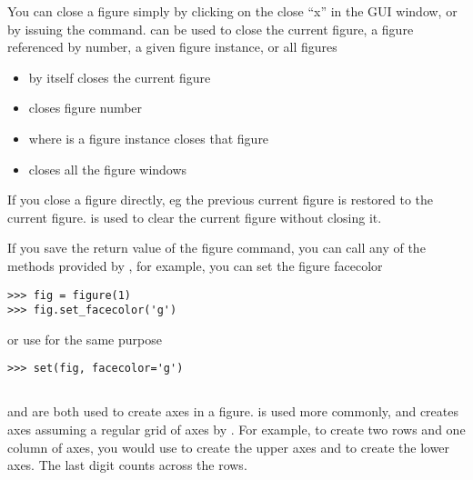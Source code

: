 \documentclass[twoside]{book}
\begin{document}
You can close a figure simply by clicking on the close ``x'' in the
GUI window, or by issuing the  command.   can
be used to close the current figure, a figure referenced by number, a
given figure instance, or all figures

\begin{itemize}

  \item {} by itself closes the current figure

  \item {} closes figure number 
    
  \item {} where  is a figure instance closes
    that figure

  \item {} closes all the figure windows

\end{itemize}
    
\noindent If you close a figure directly, eg  the
previous current figure is restored to the current figure. 
is used to clear the current figure without closing it.

If you save the return value of the figure command, you can call any
of the methods provided by , for
example, you can set the figure facecolor

\begin{lstlisting}
>>> fig = figure(1)
>>> fig.set_facecolor('g')
\end{lstlisting}

or use  for the same purpose

\begin{lstlisting}
>>> set(fig, facecolor='g')
\end{lstlisting}

\subsection{}
\label{sec:subplot}

 and  are both used to create axes in a
figure.   is used more commonly, and creates axes
assuming a  regular grid of axes  by .
For example, to create two rows and one column of axes, you would use
 to create the upper axes and 
to create the lower axes.  The last digit counts across the rows.
\end{document}
